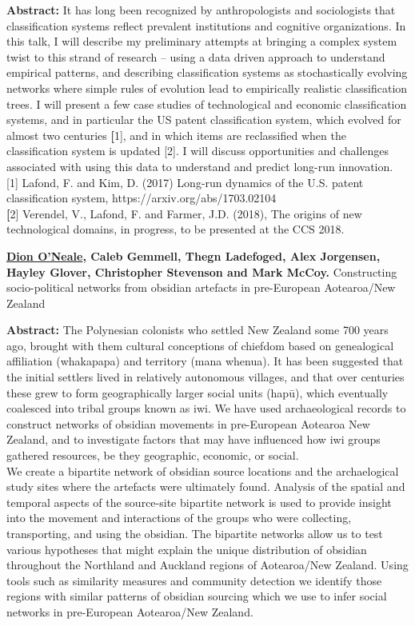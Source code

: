 \documentclass[]{article}
\begin{document}
\textbf{Abstract:} It has long been recognized by anthropologists and
sociologists that classification systems reflect prevalent institutions
and cognitive organizations. In this talk, I will describe my
preliminary attempts at bringing a complex system twist to this strand
of research -- using a data driven approach to understand empirical
patterns, and describing classification systems as stochastically
evolving networks where simple rules of evolution lead to empirically
realistic classification trees. I will present a few case studies of
technological and economic classification systems, and in particular the
US patent classification system, which evolved for almost two centuries
{\bf [}1{]}, and in which items are reclassified when the classification
system is updated {[}2{]}. I will discuss opportunities and challenges
associated with using this data to understand and predict long-run
innovation.\\[2\baselineskip]{[}1{]} Lafond, F. and Kim, D. (2017)
Long-run dynamics of the U.S. patent classification system,
https://arxiv.org/abs/1703.02104\\
{\bf [}2{]} Verendel, V., Lafond, F. and Farmer, J.D. (2018), The origins of
new technological domains, in progress, to be presented at the CCS 2018.

{\bf {\href{https://www.physics.auckland.ac.nz/people/done006}{Dion
O'Neale}, Caleb Gemmell, Thegn Ladefoged, Alex Jorgensen, Hayley Glover,
Christopher Stevenson and Mark McCoy}. }{Constructing socio-political
networks from obsidian artefacts in pre-European Aotearoa/New Zealand}

\textbf{Abstract:} The Polynesian colonists who settled New Zealand some
700 years ago, brought with them cultural conceptions of chiefdom based
on genealogical affiliation (whakapapa) and territory (mana whenua). It
has been suggested that the initial settlers lived in relatively
autonomous villages, and that over centuries these grew to form
geographically larger social units (hapū), which eventually coalesced
into tribal groups known as iwi. We have used archaeological records to
construct networks of obsidian movements in pre-European Aotearoa New
Zealand, and to investigate factors that may have influenced how iwi
groups gathered resources, be they geographic, economic, or social.\\
We create a bipartite network of obsidian source locations and the
archaelogical study sites where the artefacts were ultimately found.
Analysis of the spatial and temporal aspects of the source-site
bipartite network is used to provide insight into the movement and
interactions of the groups who were collecting, transporting, and using
the obsidian. The bipartite networks allow us to test various hypotheses
that might explain the unique distribution of obsidian throughout the
Northland and Auckland regions of Aotearoa/New Zealand. Using tools such
as similarity measures and community detection we identify those regions
with similar patterns of obsidian sourcing which we use to infer social
networks in pre-European Aotearoa/New Zealand.
\end{document}
